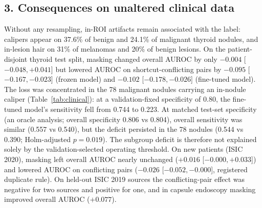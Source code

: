 \documentclass[12pt]{article}
\begin{document}
\begin{table}[t]\centering\small
\caption{Location crossover $[\text{mask}-\text{ERM}]_{\text{out}}-[\text{mask}-\text{ERM}]_{\text{in}}$ in
reversed-test AUROC (DINOv2; 95\% crossed CIs). Matched: 1:1 propensity matching. Transplant: the same artifact pasted
inside or outside the ROI of the same images; neutral: neutral tissue pasted through the same masks.}\label{tab:law}
\setlength{\tabcolsep}{3pt}
\par{}
\end{table}

\subsection*{3. Consequences on unaltered clinical data}
Without any resampling, in-ROI artifacts remain associated with the label: calipers appear on 37.6\% of benign and 24.1\%
of malignant thyroid nodules, and in-lesion hair on 31\% of melanomas and 20\% of benign lesions. On the patient-disjoint
thyroid test split, masking changed overall AUROC by only $-0.004$ [$-0.048, +0.041$] but lowered AUROC on
shortcut-conflicting pairs by $-0.095$ [$-0.167, -0.023$] (frozen model) and $-0.102$ [$-0.178, -0.026$] (fine-tuned
model). The loss was concentrated in the 78 malignant nodules carrying an in-nodule caliper (Table~\ref{tab:clinical}): at
a validation-fixed specificity of 0.80, the fine-tuned model's sensitivity fell from 0.744 to 0.223. At matched test-set
specificity (an oracle analysis; overall specificity 0.806 vs 0.804), overall sensitivity was similar (0.557 vs 0.540), but
the deficit persisted in the 78 nodules (0.544 vs 0.390; Holm-adjusted $p=0.019$). The subgroup deficit is therefore not
explained solely by the validation-selected operating threshold. On new patients (ISIC 2020), masking left overall AUROC
nearly unchanged ($+0.016$ [$-0.000, +0.033$]) and lowered AUROC on conflicting pairs ($-0.026$ [$-0.052, -0.000$],
registered duplicate rule). On held-out ISIC 2019 sources the conflicting-pair effect was negative for two sources and
positive for one, and in capsule endoscopy masking improved overall AUROC ($+0.077$).
\end{document}
